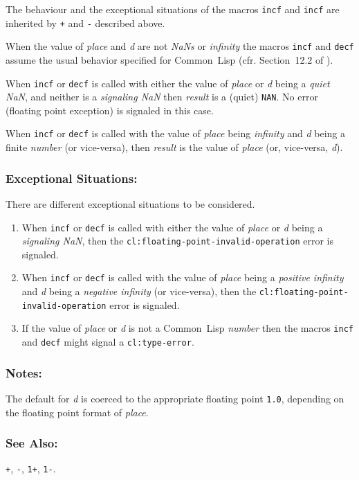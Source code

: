 \documentclass[10pt,fleqn]{article}
\newcommand{\CL}{\textsf{Common~Lisp}}
\newcommand{\code}[1]{\texttt{#1}}
\newcommand{\clieeeterm}[1]{\textit{#1}}
\newcommand{\varname}[1]{\textit{#1}}
\newcommand{\clterm}[1]{\textit{#1}}
\newcommand{\clname}[1]{\texttt{#1}}
\newcommand{\DExceptional}{\subsubsection*{Exceptional Situations:}}
\newcommand{\DNotes}{\subsubsection*{Notes:}}
\newcommand{\DSeeAlso}{\subsubsection*{See Also:}}
\begin{document}
The behaviour and the exceptional situations of the macros \code{incf} and
\code{incf} are inherited by \code{+} and \code{-} described above.

When the value of \varname{place} and \varname{d} are not
\clieeeterm{NaNs} or \clieeeterm{infinity} the macros \code{incf} and
\code{decf} assume the usual behavior specified for \CL{} (cfr.
Section~12.2 of \cite{1996:ANSIHyperSpec}).

When \code{incf} or \code{decf} is called with either the value of
\varname{place} or \varname{d} being a \clieeeterm{quiet NaN}, and
neither is a \clieeeterm{signaling NaN} then \varname{result} is a
(quiet) \code{NAN}. No error (floating point exception) is signaled in
this case.

When \code{incf} or \code{decf} is called with the value of
\varname{place} being \clieeeterm{infinity}  and \varname{d} being a
finite \clterm{number} (or vice-versa), then \varname{result} is the
value of \varname{place} (or, vice-versa, \varname{d}).

\DExceptional{}

There are different exceptional situations to be considered.

\begin{enumerate}
\item When \code{incf} or \code{decf} is called with either the value of
  \varname{place} or \varname{d} being a \emph{signaling NaN}, then the
  \clname{cl:floating-point-invalid-operation} error is signaled.

\item When \code{incf} or \code{decf} is called with the value of
  \varname{place} being a \clieeeterm{positive infinity} and \varname{d}
  being a \clieeeterm{negative infinity} (or vice-versa), then the
  \clname{cl:floating-point-invalid-operation} error is signaled.

\item If the value of \varname{place} or \varname{d} is not a \CL{}
  \clterm{number} then the macros \code{incf} and \code{decf}
  might signal a \clname{cl:type-error}.
\end{enumerate}

\DNotes{}

The default for \varname{d} is coerced to the appropriate floating
point \code{1.0}, depending on the floating point format of
\varname{place}.

\DSeeAlso{}

\code{+}, \code{-}, \code{1+}, \code{1-}.
\end{document}
